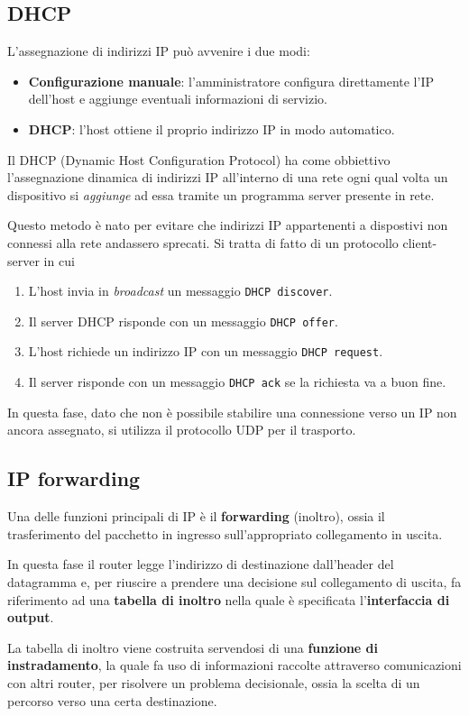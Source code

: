 \subsection{DHCP}
L'assegnazione di indirizzi IP può avvenire i due modi:
\begin{itemize}
	\item \textbf{Configurazione manuale}: l'amministratore configura 
		direttamente l'IP dell'host e aggiunge eventuali informazioni 
		di servizio.
	\item \textbf{DHCP}: l'host ottiene il proprio indirizzo IP in 
		modo automatico.
\end{itemize}
Il DHCP (Dynamic Host Configuration Protocol) ha come obbiettivo 
l'assegnazione dinamica di indirizzi IP all'interno di una rete ogni
qual volta un dispositivo si \emph{aggiunge} ad essa tramite un 
programma server presente in rete.

Questo metodo è nato per evitare che indirizzi IP appartenenti a 
dispostivi non connessi alla rete andassero sprecati. Si tratta 
di fatto di un protocollo client-server in cui
\begin{enumerate}
	\item L'host invia in \emph{broadcast} un messaggio 
		\verb|DHCP discover|.
	\item Il server DHCP risponde con un messaggio \verb|DHCP offer|.
	\item L'host richiede un indirizzo IP con un messaggio 
		\verb|DHCP request|.
	\item Il server risponde con un messaggio \verb|DHCP ack| se la 
		richiesta va a buon fine.
\end{enumerate}
In questa fase, dato che non è possibile stabilire una connessione 
verso un IP non ancora assegnato, si utilizza il protocollo UDP per 
il trasporto.

\subsection{IP forwarding}
Una delle funzioni principali di IP è il \textbf{forwarding} 
(inoltro), ossia il trasferimento del pacchetto in ingresso 
sull'appropriato collegamento in uscita.

In questa fase il router legge l'indirizzo di destinazione 
dall'header del datagramma e, per riuscire a prendere una decisione 
sul collegamento di uscita, fa riferimento ad una 
\textbf{tabella di inoltro} nella quale è specificata
l'\textbf{interfaccia di output}.

La tabella di inoltro viene costruita servendosi di una
\textbf{funzione di instradamento}, la quale fa uso di informazioni
raccolte attraverso comunicazioni con altri router, per risolvere un
problema decisionale, ossia la scelta di un percorso verso una certa
destinazione.

